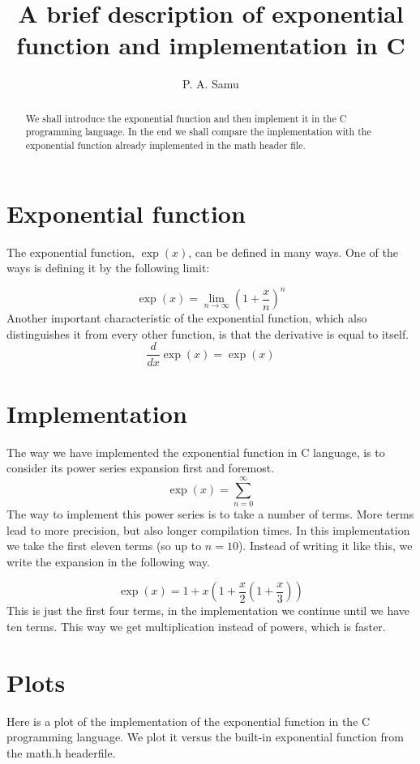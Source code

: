 \documentclass[twocolumn]{article}
\title{A brief description of exponential function and implementation in C}
\author{P. A. Samu}
\date{}
\begin{document}
\maketitle

\begin{abstract}
We shall introduce the exponential function and then implement it in the C programming language. In the end we shall compare the implementation with the exponential function already implemented in the math header file.
\end{abstract}

\section{Exponential function}
The exponential function, $\exp(x)$, can be defined in many ways. One of the ways is defining it by the following limit:

\begin{equation}
	\exp(x)=\lim_{n \rightarrow \infty}(1+\frac{x}{n})^n
\end{equation}
Another important characteristic of the exponential function, which also distinguishes it from every other function, is that the derivative is equal to itself.
\begin{equation}
	\frac{d}{dx}\exp(x)=\exp(x)
\end{equation}

\section{Implementation}
The way we have implemented the exponential function in C language, is to consider its power series expansion first and foremost.
\begin{equation}
	\exp(x)=\sum_{n=0}^{\infty} 
\end{equation}
The way to implement this power series is to take a number of terms. More terms lead to more precision, but also longer compilation times. In this implementation we take the first eleven terms (so up to $n=10$). Instead of writing it like this, we write the expansion in the following way.

\begin{equation}
	\exp(x)=1+x(1+\frac{x}{2}(1+\frac{x}{3}))
\end{equation}
This is just the first four terms, in the implementation we continue until we have ten terms. This way we get multiplication instead of powers, which is faster. 

\section{Plots}
Here is a plot of the implementation of the exponential function in the C programming language. We plot it versus the built-in exponential function from the math.h headerfile. 
\end{document}
